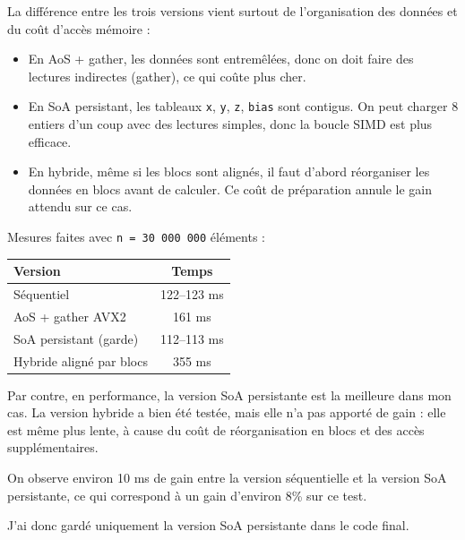 \documentclass[a4paper,12pt]{article}
\begin{document}
La différence entre les trois versions vient surtout de l'organisation des données et du coût d'accès mémoire :
\begin{itemize}
    \item En AoS + gather, les données sont entremêlées, donc on doit faire des lectures indirectes (gather), ce qui coûte plus cher.
    \item En SoA persistant, les tableaux \texttt{x}, \texttt{y}, \texttt{z}, \texttt{bias} sont contigus. On peut charger 8 entiers d'un coup avec des lectures simples, donc la boucle SIMD est plus efficace.
    \item En hybride, même si les blocs sont alignés, il faut d'abord réorganiser les données en blocs avant de calculer. Ce coût de préparation annule le gain attendu sur ce cas.
\end{itemize}

Mesures faites avec \texttt{n = 30\,000\,000} éléments :
\begin{center}
\begin{tabular}{|l|c|}
\hline
Version & Temps \\
\hline
Séquentiel & 122--123 ms \\
AoS + gather AVX2 & 161 ms \\
SoA persistant (garde) & 112--113 ms \\
Hybride aligné par blocs & 355 ms \\
\hline
\end{tabular}
\end{center}

Par contre, en performance, la version SoA persistante est la meilleure dans mon cas. La version hybride a bien été testée, mais elle n'a pas apporté de gain : elle est même plus lente, à cause du coût de réorganisation en blocs et des accès supplémentaires.

On observe environ 10 ms de gain entre la version séquentielle et la version SoA persistante, ce qui correspond à un gain d'environ 8\% sur ce test.

J'ai donc gardé uniquement la version SoA persistante dans le code final.
\end{document}
